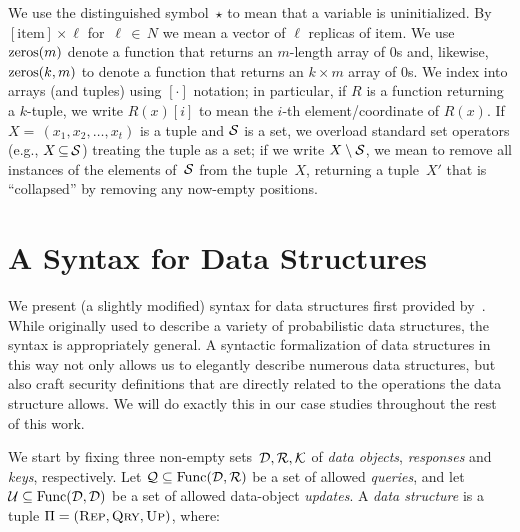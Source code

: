 We use the distinguished symbol~$\star$ to mean that a variable is uninitialized. By $[\text{item}] \times \ell$ for~$\ell \,{\in}\, N$ we mean a vector of $\ell$ replicas of $\text{item}$. We use $\mathrm{zeros}(m)$ denote a function that returns an $m$-length array of 0s and, likewise, $\mathrm{zeros}(k,m)$ to denote a function that returns an $k \times m$ array of 0s.  We index into arrays (and tuples) using $[\cdot]$ notation; in particular, if $R$ is a function returning a $k$-tuple, we write $R(x)[i]$ to mean the $i$-th element/coordinate of $R(x)$.  If~$X{=}\,(x_1,x_2,\ldots,x_t)$ is a tuple and $\mathcal{S}$ is a set, we overload standard set operators (e.g., $X \,{\subseteq}\, \mathcal{S}$) treating the tuple as a set; if we write $X \setminus \mathcal{S}$, we mean to remove all instances of the elements of~$\mathcal{S}$ from the tuple~$X$, returning a tuple~$X'$ that is ``collapsed'' by removing any now-empty positions.

\section{A Syntax for Data Structures}\label{subsec:syntax}

We present (a slightly modified) syntax for data structures first provided by~\cite{clayton2019}. While originally used to describe a variety of probabilistic data structures, the syntax is appropriately general. A syntactic formalization of data structures in this way not only allows us to elegantly describe numerous data structures, but also craft security definitions that are directly related to the operations the data structure allows. We will do exactly this in our case studies throughout the rest of this work.

We start by fixing three non-empty sets~$\mathcal{D},\mathcal{R},\mathcal{K}$ of \emph{data objects}, \emph{responses} and \emph{keys}, respectively.  Let $\mathcal{Q}\subseteq \mathrm{Func}(\mathcal{D},\mathcal{R})$ be a set of allowed \emph{queries}, and let $\mathcal{U} \subseteq \mathrm{Func}(\mathcal{D},\mathcal{D})$ be a set of allowed data-object \emph{updates}.  A {\em data structure} is a tuple $\Pi =
(\textnormal{\textsc{Rep}},\textnormal{\textsc{Qry}},\textnormal{\textsc{Up}})$, where:


